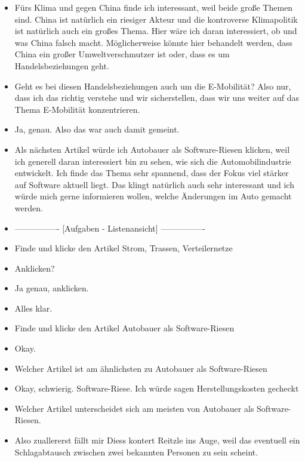 {\begin{itemize}[]
        \item {} \flqq Fürs Klima und gegen China\frqq{} finde ich interessant, weil beide große Themen sind.
        China ist natürlich ein riesiger Akteur und die kontroverse Klimapolitik ist natürlich auch ein großes Thema.
        Hier wäre ich daran interessiert, ob und was China falsch macht.
        Möglicherweise könnte hier behandelt werden, dass China ein großer Umweltverschmutzer ist oder, dass es um Handelsbeziehungen geht.
        \item {} Geht es bei diesen Handelsbeziehungen auch um die E-Mobilität? 
        Also nur, dass ich das richtig verstehe und wir sicherstellen, dass wir uns weiter auf das Thema E-Mobilität konzentrieren. 
        \item {} Ja, genau. Also das war auch damit gemeint.
        \item {} Als nächsten Artikel würde ich \flqq Autobauer als Software-Riesen\frqq{} klicken, weil ich generell daran interessiert bin zu sehen, wie sich die Automobilindustrie entwickelt.
        Ich finde das Thema sehr spannend, dass der Fokus viel stärker auf Software aktuell liegt.
        Das klingt natürlich auch sehr interessant und ich würde mich gerne informieren wollen, welche Änderungen im Auto gemacht werden.
        \item {----------------} [Aufgaben - Listenansicht] {----------------}
        \item {} Finde und klicke den Artikel \flqq Strom, Trassen, Verteilernetze\frqq{}
        \item {} Anklicken?
        \item {} Ja genau, anklicken.
        \item {} Alles klar.
        \item {} Finde und klicke den Artikel \flqq Autobauer als Software-Riesen\frqq{}
        \item {} Okay.
        \item {} Welcher Artikel ist am ähnlichsten zu \flqq Autobauer als Software-Riesen\frqq{}
        \item {} Okay, schwierig. Software-Riese. Ich würde sagen \flqq Herstellungskosten gecheckt\frqq{}
        \item {} Welcher Artikel unterscheidet sich am meisten von \flqq Autobauer als Software-Riesen\frqq{}.
        \item {} Also zuallererst fällt mir Diess kontert Reitzle ins Auge, weil das eventuell ein Schlagabtausch zwischen zwei bekannten Personen zu sein scheint.

\end{itemize}}
